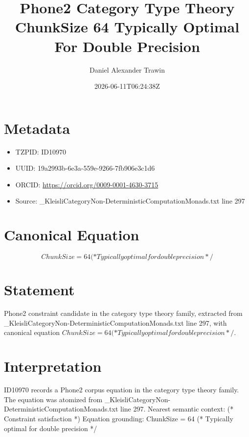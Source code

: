 \documentclass[11pt]{article}
\title{Phone2 Category Type Theory ChunkSize 64 Typically Optimal For Double Precision}
\author{Daniel Alexander Trawin}
\date{2026-06-11T06:24:38Z}
\begin{document}
\maketitle
\section*{Metadata}
\begin{itemize}
\item TZPID: ID10970
\item UUID: 19a2993b-6e3a-559e-9266-7fb906e3c1d6
\item ORCID: \url{https://orcid.org/0009-0001-4630-3715}
\item Source: _KleisliCategoryNon-DeterministicComputationMonads.txt line 297
\end{itemize}
\section*{Canonical Equation}
\[
ChunkSize = 64 (* Typically optimal for double precision */
\]
\section*{Statement}
Phone2 constraint candidate in the category type theory family, extracted from _KleisliCategoryNon-DeterministicComputationMonads.txt line 297, with canonical equation $ChunkSize = 64 (* Typically optimal for double precision */$.
\section*{Interpretation}
ID10970 records a Phone2 corpus equation in the category type theory family. The equation was atomized from _KleisliCategoryNon-DeterministicComputationMonads.txt line 297. Nearest semantic context: (* Constraint satisfaction *) Equation grounding: ChunkSize = 64 (* Typically optimal for double precision */
\end{document}
